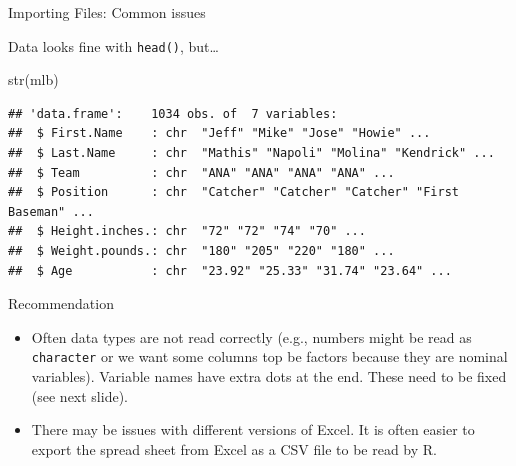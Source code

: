 \documentclass[
  9pt,
  ignorenonframetext,
]{beamer}
\newenvironment{Shaded}{\begin{snugshade}}{\end{snugshade}}
\newcommand{\KeywordTok}[1]{\textcolor[rgb]{0.94,0.87,0.69}{#1}}
\newcommand{\NormalTok}[1]{\textcolor[rgb]{0.80,0.80,0.80}{#1}}
\providecommand{\tightlist}{%
  \setlength{\itemsep}{0pt}\setlength{\parskip}{0pt}}
\begin{document}
\begin{frame}[fragile]{Importing Files: Common issues}
\protect\hypertarget{importing-files-common-issues}{}
\footnotesize

Data looks fine with \texttt{head()}, but\ldots{}

\vfill

\begin{Shaded}
\begin{Highlighting}[]
\KeywordTok{str}\NormalTok{(mlb)}
\end{Highlighting}
\end{Shaded}

\begin{verbatim}
## 'data.frame':    1034 obs. of  7 variables:
##  $ First.Name    : chr  "Jeff" "Mike" "Jose" "Howie" ...
##  $ Last.Name     : chr  "Mathis" "Napoli" "Molina" "Kendrick" ...
##  $ Team          : chr  "ANA" "ANA" "ANA" "ANA" ...
##  $ Position      : chr  "Catcher" "Catcher" "Catcher" "First Baseman" ...
##  $ Height.inches.: chr  "72" "72" "74" "70" ...
##  $ Weight.pounds.: chr  "180" "205" "220" "180" ...
##  $ Age           : chr  "23.92" "25.33" "31.74" "23.64" ...
\end{verbatim}

\vfill

\begin{block}{Recommendation}
\protect\hypertarget{recommendation}{}
\begin{itemize}
\tightlist
\item
  Often data types are not read correctly (e.g., numbers might be read
  as \texttt{character} or we want some columns top be factors because
  they are nominal variables). Variable names have extra dots at the
  end. These need to be fixed (see next slide).
\item
  There may be issues with different versions of Excel. It is often
  easier to export the spread sheet from Excel as a CSV file to be read
  by R.
\end{itemize}
\end{block}
\end{frame}
\end{document}
